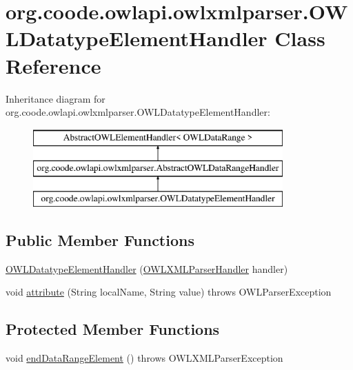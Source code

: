\hypertarget{classorg_1_1coode_1_1owlapi_1_1owlxmlparser_1_1_o_w_l_datatype_element_handler}{\section{org.\-coode.\-owlapi.\-owlxmlparser.\-O\-W\-L\-Datatype\-Element\-Handler Class Reference}
\label{classorg_1_1coode_1_1owlapi_1_1owlxmlparser_1_1_o_w_l_datatype_element_handler}
}
Inheritance diagram for org.\-coode.\-owlapi.\-owlxmlparser.\-O\-W\-L\-Datatype\-Element\-Handler\-:\begin{figure}[H]
\begin{center}
\leavevmode
\includegraphics[height=3.000000cm]{classorg_1_1coode_1_1owlapi_1_1owlxmlparser_1_1_o_w_l_datatype_element_handler}
\end{center}
\end{figure}
\subsection*{Public Member Functions}
\begin{DoxyCompactItemize}
\item 
\hyperlink{classorg_1_1coode_1_1owlapi_1_1owlxmlparser_1_1_o_w_l_datatype_element_handler_a5e09ead042cbaa05605fc6bb54791c2d}{O\-W\-L\-Datatype\-Element\-Handler} (\hyperlink{classorg_1_1coode_1_1owlapi_1_1owlxmlparser_1_1_o_w_l_x_m_l_parser_handler}{O\-W\-L\-X\-M\-L\-Parser\-Handler} handler)
\item 
void \hyperlink{classorg_1_1coode_1_1owlapi_1_1owlxmlparser_1_1_o_w_l_datatype_element_handler_a91f41c46ee4f1a4ff7bba92bc58cef1b}{attribute} (String local\-Name, String value)  throws O\-W\-L\-Parser\-Exception 
\end{DoxyCompactItemize}
\subsection*{Protected Member Functions}
\begin{DoxyCompactItemize}
\item 
void \hyperlink{classorg_1_1coode_1_1owlapi_1_1owlxmlparser_1_1_o_w_l_datatype_element_handler_a848f05eb8f17f02188df40587f9461a1}{end\-Data\-Range\-Element} ()  throws O\-W\-L\-X\-M\-L\-Parser\-Exception 
\end{DoxyCompactItemize}
